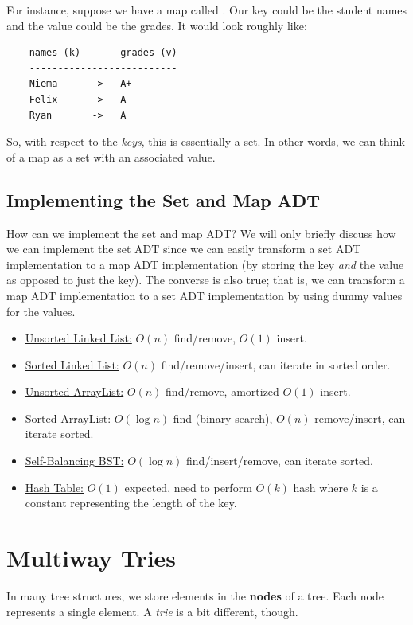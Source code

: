 \documentclass[letterpaper]{article}
\begin{document}
\bigskip 

For instance, suppose we have a map called . Our key could be the student names and the value could be the grades. It would look roughly like: 
\begin{verbatim}
    names (k)       grades (v)
    --------------------------
    Niema      ->   A+ 
    Felix      ->   A 
    Ryan       ->   A
\end{verbatim}
So, with respect to the \emph{keys}, this is essentially a set. In other words, we can think of a map as a set with an associated value. 

\subsection{Implementing the Set and Map ADT}
How can we implement the set and map ADT? We will only briefly discuss how we can implement the set ADT since we can easily transform a set ADT implementation to a map ADT implementation (by storing the key \emph{and} the value as opposed to just the key). The converse is also true; that is, we can transform a map ADT implementation to a set ADT implementation by using dummy values for the values. 

\begin{itemize}
    \item \underline{Unsorted Linked List:} $O(n)$ find/remove, $O(1)$ insert.
    \item \underline{Sorted Linked List:} $O(n)$ find/remove/insert, can iterate in sorted order. 
    \item \underline{Unsorted ArrayList:} $O(n)$ find/remove, amortized $O(1)$ insert. 
    \item \underline{Sorted ArrayList:} $O(\log n)$ find (binary search), $O(n)$ remove/insert, can iterate sorted. 
    \item \underline{Self-Balancing BST:} $O(\log n)$ find/insert/remove, can iterate sorted. 
    \item \underline{Hash Table:} $O(1)$ expected, need to perform $O(k)$ hash where $k$ is a constant representing the length of the key. 
\end{itemize}


\newpage 
\section{Multiway Tries}
In many tree structures, we store elements in the \textbf{nodes} of a tree. Each node represents a single element. A \emph{trie} is a bit different, though. 
\end{document}
